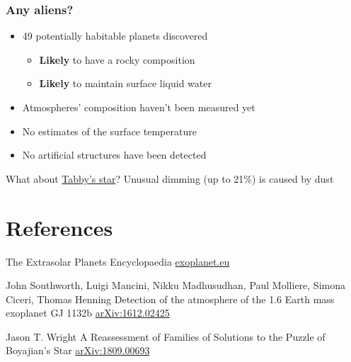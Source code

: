\documentclass{beamer}
\begin{document}
\begin{frame}
\frametitle{Any aliens?}
\begin{itemize}
\item 49 potentially habitable planets discovered
\begin{itemize}
\item {\bf Likely} to have a rocky composition
\item {\bf Likely} to maintain surface liquid water
\end{itemize}
\item Atmospheres' composition haven't been measured yet
\item No estimates of the surface temperature
\item No artificial structures have been detected
\end{itemize}
\begin{block}{What about \href{http://en.wikipedia.org/wiki/KIC_8462852}{Tabby's star}?}
Unusual dimming (up to 21\%) is caused by dust \cite{arXiv:1809.00693}
\end{block}
\end{frame}

\section{References}
\begin{frame}[allowframebreaks]
\footnotesize{


\begin{thebibliography}{99}

The Extrasolar Planets Encyclopaedia
\newblock \href{http://exoplanet.eu}{exoplanet.eu}

John Southworth, Luigi Mancini, Nikku Madhusudhan, Paul Molliere, Simona Ciceri, Thomas Henning
\newblock Detection of the atmosphere of the 1.6 Earth mass exoplanet GJ 1132b
\newblock \href{http://arxiv.org/abs/1612.02425}{arXiv:1612.02425}

Jason T. Wright
\newblock A Reassessment of Families of Solutions to the Puzzle of Boyajian's Star
\newblock \href{https://arxiv.org/abs/1809.00693}{arXiv:1809.00693}
\end{thebibliography}
}
\end{frame}
\end{document}
